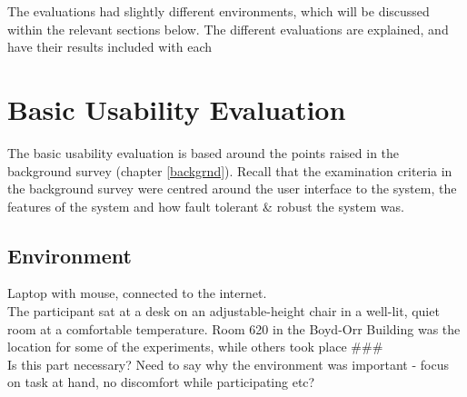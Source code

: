 \documentclass{l4proj}
\newcommand{\revisit}{\#\#\#}
\begin{document}
The evaluations had slightly different environments, which will be discussed within the relevant sections below.  The different evaluations are explained, and have their results included with each 

\section{Basic Usability Evaluation}
The basic usability evaluation is based around the points raised in the background survey (chapter \ref{backgrnd}).  Recall that the examination criteria in the background survey were centred around the user interface to the system, the features of the system and how fault tolerant \& robust the system was.\\

\subsection{Environment}
Laptop with mouse, connected to the internet.\\
The participant sat at a desk on an adjustable-height chair in a well-lit, quiet room at a comfortable temperature.	Room 620 in the Boyd-Orr Building was the location for some of the experiments, while others took place \revisit \\
Is this part necessary? Need to say why the environment was important - focus on task at hand, no discomfort while participating etc?
\end{document}
